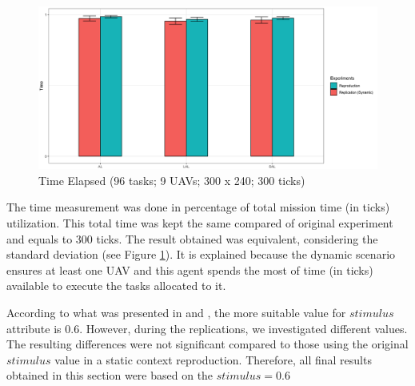 \begin{figure}[h!]
	\begin{center}
		\includegraphics[scale=0.15]{fig/time_orig.png}
		\caption{Time Elapsed (96 tasks; 9 UAVs; 300 x 240; 300 ticks)}
		\label{fig:time}
	\end{center}
\end{figure}

The time measurement was done in percentage of total mission time (in ticks) utilization. This total time was kept the same compared of original experiment and equals to 300 ticks. The result obtained was equivalent, considering the standard deviation (see Figure \ref{fig:time}). It is explained because the dynamic scenario ensures at least one UAV and this agent spends the most of time (in ticks) available to execute the tasks allocated to it.

According to what was presented in \cite{MAS07} and \cite{ferreira2007swarm}, the more suitable value for $stimulus$ attribute is $0.6$. However, during the replications, we investigated different values. The resulting differences were not significant compared to those using the original $stimulus$ value in a static context reproduction. Therefore, all final results obtained in this section were based on the $stimulus = 0.6$